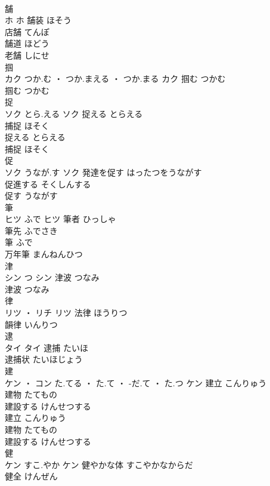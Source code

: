 \documentclass[8pt]{extreport}
\begin{document}
\begin{CJK}{UTF8}{min}
\\	舗	
\\	ホ		ホ	舗装	ほそう	
\\	店舗	てんぽ	
\\	舗道	ほどう	
\\	老舗	しにせ	
\\	掴	
\\	カク	つか.む ・ つか.まえる ・ つか.まる	カク	掴む	つかむ	
\\	掴む	つかむ	
\\	捉	
\\	ソク	とら.える	ソク	捉える	とらえる	
\\	捕捉	ほそく	
\\	捉える	とらえる	
\\	捕捉	ほそく	
\\	促	
\\	ソク	うなが.す	ソク	発達を促す	はったつをうながす	
\\	促進する	そくしんする	
\\	促す	うながす	
\\	筆	
\\	ヒツ	ふで	ヒツ	筆者	ひっしゃ	
\\	筆先	ふでさき	
\\	筆	ふで	
\\	万年筆	まんねんひつ	
\\	津	
\\	シン	つ	シン	津波	つなみ	
\\	津波	つなみ	
\\	律	
\\	リツ ・ リチ		リツ	法律	ほうりつ	
\\	韻律	いんりつ	
\\	逮	
\\	タイ		タイ	逮捕	たいほ	
\\	逮捕状	たいほじょう	
\\	建	
\\	ケン ・ コン	た.てる ・ た.て ・ -だ.て ・ た.つ	ケン	建立	こんりゅう	
\\	建物	たてもの	
\\	建設する	けんせつする	
\\	建立	こんりゅう	
\\	建物	たてもの	
\\	建設する	けんせつする	
\\	健	
\\	ケン	すこ.やか	ケン	健やかな体	すこやかなからだ	
\\	健全	けんぜん	

\end{CJK}
\end{document}
